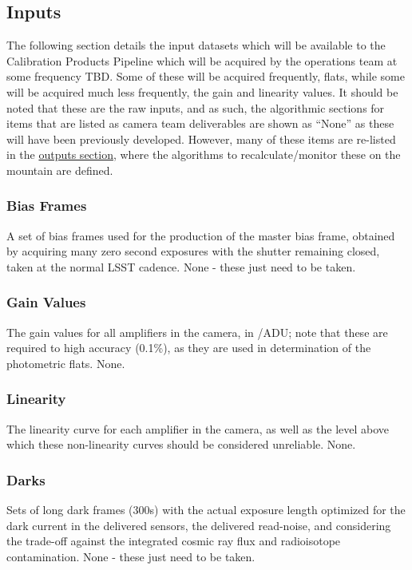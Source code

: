 
\subsection{Inputs}
\label{sec:CPP:inputs}
The following section details the input datasets which will be available to the Calibration Products Pipeline which will be acquired by the operations team at some frequency TBD. Some of these will be acquired frequently, \eg flats, while some will be acquired much less frequently, \eg the gain and linearity values. It should be noted that these are the raw inputs, and as such, the algorithmic sections for items that are listed as camera team deliverables are shown as ``None'' as these will have been previously developed. However, many of these items are re-listed in the \hyperref[sec:CPP:output]{outputs section}, where the algorithms to recalculate/monitor these on the mountain are defined.


\subsubsection{Bias Frames}\label{sec:CPP:inputs:biases}
A set of bias frames used for the production of the master bias frame, obtained by acquiring many zero second exposures with the shutter remaining closed, taken at the normal LSST cadence.
\alg None - these just need to be taken.


\subsubsection{Gain Values}\label{sec:CPP:inputs:gain}
\cameraTeam
The gain values for all amplifiers in the camera, in \electron/ADU; note that these are required to high accuracy (0.1\%), as they are used in determination of the photometric flats.
\alg None.


\subsubsection{Linearity}\label{sec:CPP:inputs:linearityCurve}
\cameraTeam
The linearity curve for each amplifier in the camera, as well as the level above which these non-linearity curves should be considered unreliable.
\alg None.


\subsubsection{Darks}\label{sec:CPP:inputs:dark}
Sets of long dark frames (\smalltilde 300s) with the actual exposure length optimized for the dark current in the delivered sensors, the delivered read-noise, and considering the trade-off against the integrated cosmic ray flux and radioisotope contamination.
\alg None - these just need to be taken.


